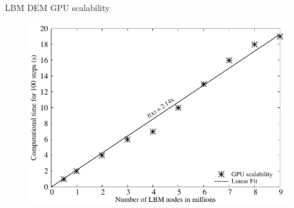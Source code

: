 \documentclass[10pt,times]{beamer}
\begin{document}
\begin{frame}{LBM DEM GPU scalability}

\begin{figure}
\includegraphics[width=.8\linewidth]{figs/GPU_Speedup}
\end{figure}
\end{frame}
\end{document}
